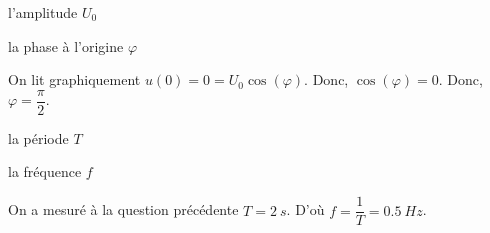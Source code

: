 
\begin{enonce}
l'amplitude $U_0$
\end{enonce}





\begin{enonce}
la phase à l'origine $\varphi$
\end{enonce}


\begin{corrige}
On lit graphiquement $u(0)=0=U_0\cos(\varphi)$. Donc, $\cos(\varphi)=0$. Donc, $\varphi=\dfrac{\pi}{2}$.
\end{corrige}



\begin{enonce}
la période $T$
\end{enonce}





\begin{enonce}
la fréquence $f$
\end{enonce}


\begin{corrige}
On a mesuré à la question précédente $T=\SI{2}{s}$. D'où $f=\dfrac{1}{T}=\SI{0,5}{Hz}$.
\end{corrige}

